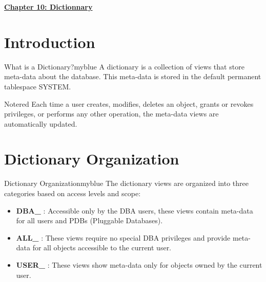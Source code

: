 \newpage 
\null 
\vspace{0.15cm}

\begin{center} 
\Huge{\textbf{\underline{Chapter 10: Dictionnary}}}
\end{center}

\vspace{0.25cm}

\setcounter{section}{0}


\section{Introduction}
\begin{prettyBox}{What is a Dictionary?}{myblue}
A dictionary is a collection of views that store meta-data about the database. 
This meta-data is stored in the default permanent tablespace SYSTEM.
\end{prettyBox}

\vspace{0.25cm}

\begin{prettyBox}{Note}{red}
Each time a user creates, modifies, deletes an object, grants or revokes privileges, or performs any other operation, the meta-data views are automatically updated.
\end{prettyBox}

\vspace{0.35cm}
\section{Dictionary Organization}
\begin{prettyBox}{Dictionary Organization}{myblue}
The dictionary views are organized into three categories based on access levels and scope:
\begin{itemize}
    \item \textbf{DBA\_} : Accessible only by the DBA users, these views contain meta-data for all users and PDBs (Pluggable Databases).
    \item \textbf{ALL\_} : These views require no special DBA privileges and provide meta-data for all objects accessible to the current user.
    \item \textbf{USER\_} : These views show meta-data only for objects owned by the current user.
\end{itemize}
\end{prettyBox}


\vspace{0.35cm}
